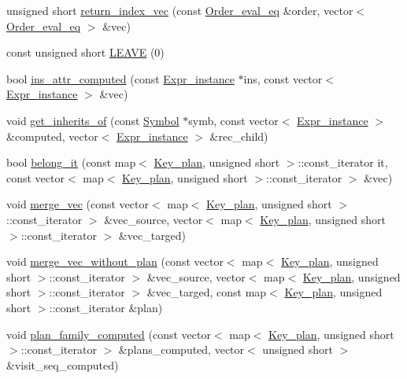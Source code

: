 \begin{DoxyCompactItemize}
\item 
unsigned short \hyperlink{namespacegenevalmag_a4c59332bf08ed52e98321fe6b6340f29}{return\_\-index\_\-vec} (const \hyperlink{namespacegenevalmag_a0bb2e8b0fa1b07b873f0363719de7b64}{Order\_\-eval\_\-eq} \&order, vector$<$ \hyperlink{namespacegenevalmag_a0bb2e8b0fa1b07b873f0363719de7b64}{Order\_\-eval\_\-eq} $>$ \&vec)
\item 
const unsigned short \hyperlink{namespacegenevalmag_a48db0c2de005498a27cd549338a38cdd}{LEAVE} (0)
\item 
bool \hyperlink{namespacegenevalmag_abf07d8c3d3faf1a57304337d32ff0f29}{ins\_\-attr\_\-computed} (const \hyperlink{classgenevalmag_1_1Expr__instance}{Expr\_\-instance} $\ast$ins, const vector$<$ \hyperlink{classgenevalmag_1_1Expr__instance}{Expr\_\-instance} $>$ \&vec)
\item 
void \hyperlink{namespacegenevalmag_ae77f9a26f51553fb1419a41295da521a}{get\_\-inherits\_\-of} (const \hyperlink{classgenevalmag_1_1Symbol}{Symbol} $\ast$symb, const vector$<$ \hyperlink{classgenevalmag_1_1Expr__instance}{Expr\_\-instance} $>$ \&computed, vector$<$ \hyperlink{classgenevalmag_1_1Expr__instance}{Expr\_\-instance} $>$ \&rec\_\-child)
\item 
bool \hyperlink{namespacegenevalmag_ad52b23b8c38d8b9ef4c91820a512c963}{belong\_\-it} (const map$<$ \hyperlink{structgenevalmag_1_1k__plan}{Key\_\-plan}, unsigned short $>$::const\_\-iterator it, const vector$<$ map$<$ \hyperlink{structgenevalmag_1_1k__plan}{Key\_\-plan}, unsigned short $>$::const\_\-iterator $>$ \&vec)
\item 
void \hyperlink{namespacegenevalmag_a3d48cfd13c4608c5235a6968c63855da}{merge\_\-vec} (const vector$<$ map$<$ \hyperlink{structgenevalmag_1_1k__plan}{Key\_\-plan}, unsigned short $>$::const\_\-iterator $>$ \&vec\_\-source, vector$<$ map$<$ \hyperlink{structgenevalmag_1_1k__plan}{Key\_\-plan}, unsigned short $>$::const\_\-iterator $>$ \&vec\_\-targed)
\item 
void \hyperlink{namespacegenevalmag_a036ececec487ad3d0674f8e5e0c62f6a}{merge\_\-vec\_\-without\_\-plan} (const vector$<$ map$<$ \hyperlink{structgenevalmag_1_1k__plan}{Key\_\-plan}, unsigned short $>$::const\_\-iterator $>$ \&vec\_\-source, vector$<$ map$<$ \hyperlink{structgenevalmag_1_1k__plan}{Key\_\-plan}, unsigned short $>$::const\_\-iterator $>$ \&vec\_\-targed, const map$<$ \hyperlink{structgenevalmag_1_1k__plan}{Key\_\-plan}, unsigned short $>$::const\_\-iterator \&plan)
\item 
void \hyperlink{namespacegenevalmag_a22c7e9c74db3b8c0f0b7a3a1cbf5a978}{plan\_\-family\_\-computed} (const vector$<$ map$<$ \hyperlink{structgenevalmag_1_1k__plan}{Key\_\-plan}, unsigned short $>$::const\_\-iterator $>$ \&plans\_\-computed, vector$<$ unsigned short $>$ \&visit\_\-seq\_\-computed)

\end{DoxyCompactItemize}
